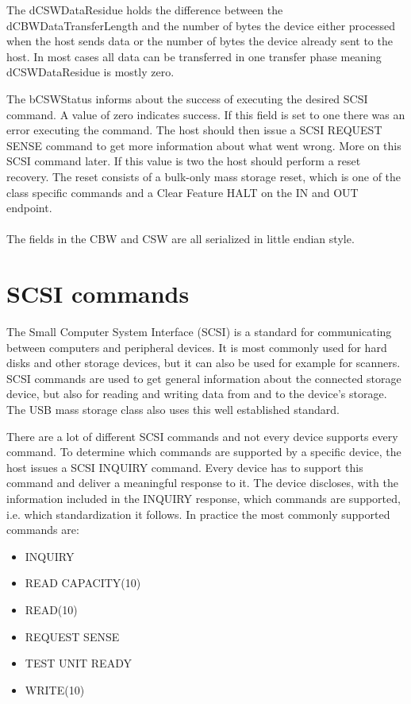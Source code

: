 \newpage

The dCSWDataResidue holds the difference between the dCBWDataTransferLength and the number of bytes the device either processed when the host sends data or the number of bytes the device already sent to the host. In most cases all data can be transferred in one transfer phase meaning dCSWDataResidue is mostly zero.

The bCSWStatus informs about the success of executing the desired SCSI command. A value of zero indicates success. If this field is set to one there was an error executing the command. The host should then issue a SCSI REQUEST SENSE command to get more information about what went wrong\cite{usb_ms_jan}. More on this SCSI command later. If this value is two the host should perform a reset recovery. The reset consists of a bulk-only mass storage reset, which is one of the class specific commands and a Clear Feature HALT on the IN and OUT endpoint\cite{usb_ms_jan, usb_mass_bulk}.
\\\\
The fields in the CBW and CSW are all serialized in little endian style.

\section{SCSI commands}
\label{section:scsi_commands}

The Small Computer System Interface (SCSI) is a standard for communicating between computers and peripheral devices. It is most commonly used for hard disks and other storage devices, but it can also be used for example for scanners\cite{wiki_scsi}. SCSI commands are used to get general information about the connected storage device, but also for reading and writing data from and to the device's storage. The USB mass storage class also uses this well established standard.

There are a lot of different SCSI commands and not every device supports every command. To determine which commands are supported by a specific device, the host issues a SCSI INQUIRY command. Every device has to support this command and deliver a meaningful response to it. The device discloses, with the information included in the INQUIRY response, which commands are supported, i.e. which standardization it follows. In practice the most commonly supported commands are\cite{usb_ms_jan}:

\begin{itemize}
\item INQUIRY
\item READ CAPACITY(10)
\item READ(10)
\item REQUEST SENSE
\item TEST UNIT READY
\item WRITE(10)
\end{itemize}

